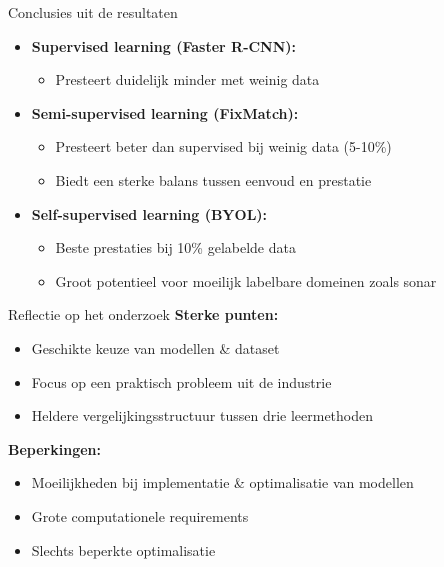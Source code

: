 \documentclass[aspectratio=169]{beamer}
\begin{document}
    \begin{frame}{Conclusies uit de resultaten}
        \begin{itemize}
            \item \textbf{Supervised learning (Faster R-CNN):}
            \begin{itemize}
                \item Presteert duidelijk minder met weinig data
            \end{itemize}
            \item \textbf{Semi-supervised learning (FixMatch):}
            \begin{itemize}
                \item Presteert beter dan supervised bij weinig data (5-10\%)
                \item Biedt een sterke balans tussen eenvoud en prestatie
            \end{itemize}
            \item \textbf{Self-supervised learning (BYOL):}
            \begin{itemize}
                \item Beste prestaties bij 10\% gelabelde data
                \item Groot potentieel voor moeilijk labelbare domeinen zoals sonar
            \end{itemize}
        \end{itemize}
    \end{frame}
    
    \begin{frame}{Reflectie op het onderzoek}
        \textbf{Sterke punten:} \\
        \begin{itemize}
            \item Geschikte keuze van modellen \& dataset
            \item Focus op een praktisch probleem uit de industrie
            \item Heldere vergelijkingsstructuur tussen drie leermethoden
        \end{itemize}
        \textbf{Beperkingen:} \\
        \begin{itemize}
            \item Moeilijkheden bij implementatie \& optimalisatie van modellen
            \item Grote computationele requirements
            \item Slechts beperkte optimalisatie
        \end{itemize}
    \end{frame}
    
\end{document}
